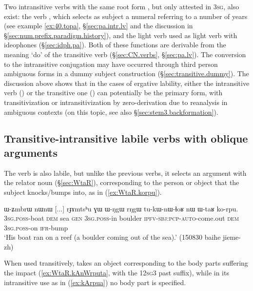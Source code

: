 Two intransitive verbs with the same root form , but only attested in \textsc{3sg}, also exist: the verb , which selects as subject a numeral referring to a number of years (see example \ref{ex:40.topa}, §\ref{sec:pa.intr.lv} and the discussion in §\ref{sec:num.prefix.paradigm.history}), and the light verb  used as light verb with ideophones (§\ref{sec:idph.pa}). Both of these functions are derivable from the meaning `do' of the transitive verb (§\ref{sec:CN.verbs}, §\ref{sec:pa.lv}). The conversion to the intransitive conjugation may have occurred through third person ambiguous forms in a dummy subject construction (§\ref{sec:transitive.dummy}).
\newpage
The discussion above shows that in the cases of ergative lability, either the intransitive verb () or the transitive one () can potentially be the primary form, with transitivization or intransitivization by zero-derivation due to reanalysis in ambiguous contexts (on this topic, see also §\ref{sec:stem3.backformation}).

\subsection{Transitive-intransitive labile verbs with oblique arguments} \label{sec:goal.labile}
The verb  is also labile, but unlike the previous verbs, it selects an argument with the relator noun  (§\ref{sec:WtaR}), corresponding to the person or object that the subject knocks/bumps into, as in (\ref{ex:WtaR.korpu}).
 
 \begin{exe}
\ex \label{ex:WtaR.korpu}
\gll   ɯ-ʑmbrɯ nɯnɯ [...] rɟɤmtsʰu ɣɯ ɯ-ŋgɯ rŋgɯ tu-kɯ-nɯ-ɬoʁ nɯ ɯ-taʁ ko-rpu. \\ 
\textsc{3sg}.\textsc{poss}-boat \textsc{dem} { } sea \textsc{gen} \textsc{3sg}.\textsc{poss}-in boulder \textsc{ipfv}-\textsc{sbj}:\textsc{pcp}-\textsc{auto}-come.out \textsc{dem} \textsc{3sg}.\textsc{poss}-on \textsc{ifr}-bump \\
\glt  `His boat ran on a reef (a boulder coming out of the sea).' (150830 baihe jieme-zh)
\end{exe}

When used transitively,  takes an object corresponding to the body parts suffering the impact (\ref{ex:WtaR.kAnWrputa}, with the 12\textsc{sg}\fl{}3 past  suffix), while in its intransitive use as in (\ref{ex:kArpua}) no body part is specified.

